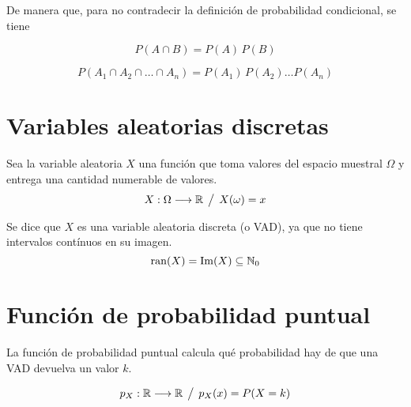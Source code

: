 De manera que, para no contradecir la definición de probabilidad condicional, se tiene

\begin{mdframed}[style=PropertyFrame]
    \begin{prop}
    \end{prop}
    \begin{equation*}
        P(A \cap B) = P(A) \, P(B)
    \end{equation*}
\end{mdframed}

\begin{mdframed}[style=PropertyFrame]
    \begin{prop}
    \end{prop}
    \begin{equation*}
        P(A_1 \cap A_2 \cap \dots \cap A_n) = P(A_1) \, P(A_2) \dots P(A_n)
    \end{equation*}
\end{mdframed}


\section{Variables aleatorias discretas}

Sea la variable aleatoria $X$ una función que toma valores del espacio muestral $\Omega$ y entrega una cantidad numerable de valores.
\begin{equation*}
    X: \Omega \longrightarrow \mathbb{R} \hspace{1ex} \big/ \hspace{1ex} X(\omega) = x
\end{equation*}

Se dice que $X$ es una variable aleatoria discreta (o VAD), ya que no tiene intervalos contínuos en su imagen.
\begin{equation*}
    \operatorname{ran}(X) = \operatorname{Im}(X) \subseteq \mathbb{N}_0
\end{equation*}


\section{Función de probabilidad puntual}

La función de probabilidad puntual calcula qué probabilidad hay de que una VAD devuelva un valor $k$.

\begin{mdframed}[style=DefinitionFrame]
    \begin{defn}
    \end{defn}
    \begin{equation*}
        p_X: \mathbb{R} \longrightarrow \mathbb{R} \hspace{1ex} \big/ \hspace{1ex} p_X(x) = P(X=k)
    \end{equation*}
\end{mdframed}


